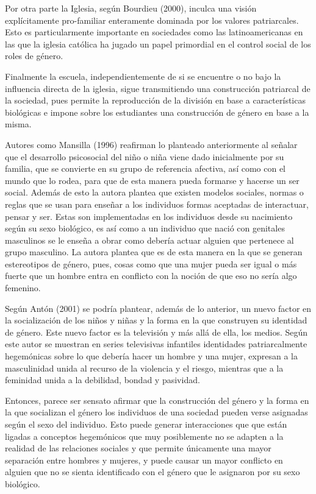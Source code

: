 Por otra parte la Iglesia, según Bourdieu (2000), inculca una visión
explícitamente pro-familiar enteramente dominada por los valores patriarcales.
Esto es particularmente importante en sociedades como las latinoamericanas en
las que la iglesia católica ha jugado un papel primordial en el control
social de los roles de género.

Finalmente la escuela, independientemente de si se encuentre o no bajo la
influencia directa de la iglesia, sigue transmitiendo una construcción
patriarcal de la sociedad, pues permite la reproducción de la división en base a
características biológicas e impone sobre los estudiantes una construcción de
género en base a la misma.

Autores como Mansilla (1996) reafirman lo planteado anteriormente al señalar que
el desarrollo psicosocial del niño o niña viene dado inicialmente por su
familia, que se convierte en su grupo de referencia afectiva, así como con el
mundo que lo rodea, para que de esta manera  pueda formarse y hacerse un ser
social.
Además de esto la autora plantea que existen modelos sociales, normas o reglas
que se usan para enseñar a los individuos formas aceptadas de interactuar,
pensar y ser.
Estas son implementadas en los individuos desde su nacimiento según su sexo
biológico, es así como a un individuo que nació con genitales masculinos se le
enseña a obrar como debería actuar alguien que pertenece al grupo masculino.
La autora plantea que es de esta manera en la que se generan estereotipos de
género, pues, cosas como que una mujer pueda ser igual o más fuerte que un
hombre entra en conflicto con la noción de que eso no sería algo femenino.

Según Antón (2001) se podría plantear, además de lo anterior, un nuevo factor en
la socialización de los niños y niñas y la forma en la que construyen su
identidad de género.
Este nuevo factor es la televisión y más allá de ella, los medios.
Según este autor se muestran en series televisivas infantiles identidades
patriarcalmente hegemónicas sobre lo que debería hacer un hombre y una mujer,
expresan a la masculinidad unida al recurso de la violencia y el riesgo,
mientras que a la feminidad unida a la debilidad, bondad y pasividad.

Entonces, parece ser sensato afirmar que la construcción del género y la forma
en la que socializan el género los individuos de una sociedad pueden verse
asignadas según el sexo del individuo.
Esto puede generar interacciones que que están ligadas a conceptos hegemónicos
que muy posiblemente no se adapten a la realidad de las relaciones sociales y
que permite únicamente una mayor separación entre hombres y mujeres, y puede
causar un mayor conflicto en alguien que no se sienta identificado con el
género que le asignaron por su sexo biológico.

